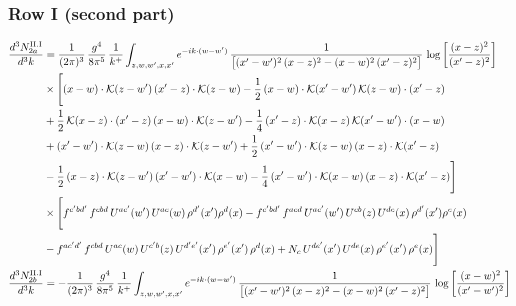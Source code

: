 \documentclass[9pt]{article}
\numberwithin{equation}{section}
\begin{document}
\subsubsection*{Row I (second part)}
\begin{align}
\frac{d^{3}N^{\rm II.I}_{2a}}{d^{3}k}&=\frac{1}{(2\pi)^{3}}\,\frac{g^{4}}{8\pi^{5}}\,\frac{1}{k^{+}}\int_{z,w,w^{\prime},x,x^{\prime}}e^{-ik\cdot(w-w^{\prime})}\,\frac{1}{\big[(x^{\prime}-w^{\prime})^{2}\,(x-z)^{2}-(x-w)^{2}\,(x^{\prime}-z)^{2}\big]}\,\log\left[\frac{(x-z)^{2}}{(x^{\prime}-z)^{2}}\right]\notag\\
&\times\Bigg[(x-w)\cdot\mathcal{K}(z-w^{\prime})\,(x^{\prime}-z)\cdot\mathcal{K}(z-w)-\frac{1}{2}\,(x-w)\cdot\mathcal{K}(x^{\prime}-w^{\prime})\,\mathcal{K}(z-w)\cdot(x^{\prime}-z)\notag \\ & +\frac{1}{2}\,\mathcal{K}(x-z)\cdot(x^{\prime}-z)\,(x-w)\cdot\mathcal{K}(z-w^{\prime}) -\frac{1}{4}\,(x^{\prime}-z)\cdot\mathcal{K}(x-z)\,\mathcal{K}(x^{\prime}-w^{\prime})\cdot(x-w)\notag \\ & +(x^{\prime}-w^{\prime})\cdot\mathcal{K}(z-w)\,(x-z)\cdot\mathcal{K}(z-w^{\prime})+\frac{1}{2}\,(x^{\prime}-w^{\prime})\cdot\mathcal{K}(z-w)\,(x-z)\cdot\mathcal{K}(x^{\prime}-z)\notag \\ & -\frac{1}{2}\,(x-z)\cdot\mathcal{K}(z-w^{\prime})\,(x^{\prime}-w^{\prime})\cdot\mathcal{K}(x-w)-\frac{1}{4}\,(x^{\prime}-w^{\prime})\cdot\mathcal{K}(x-w)\,(x-z)\cdot\mathcal{K}(x^{\prime}-z)\Bigg]\notag \\ & \times\Bigg[f^{c^{\prime}bd^{\prime}}\,f^{cbd}\, U^{ac^{\prime}}(w^{\prime})\,U^{ac}(w)\,\rho^{d^{\prime}}(x^{\prime})\rho^{d}(x)- f^{c^{\prime}bd^{\prime}}\,f^{acd}\,U^{ac^{\prime}}(w^{\prime})\,U^{cb}(z)\,U^{de}(x)\,\rho^{d^{\prime}}(x^{\prime})\rho^{e}(x) \notag \\ & -f^{ac^{\prime}d^{\prime}}\,f^{cbd}\,U^{ac}(w)\,U^{c^{\prime}b}(z)\,U^{d^{\prime}e^{\prime}}(x^{\prime})\,\rho^{e^{\prime}}(x^{\prime})\,\rho^{d}(x) +N_{c}\,U^{de^{\prime}}(x^{\prime})\,U^{de}(x)\,\rho^{e^{\prime}}(x^{\prime})\,\rho^{e}(x)\Bigg]\label{eq:B-II2a}\\
\frac{d^{3}N^{\rm II.I}_{2b}}{d^{3}k}&= -\frac{1}{(2\pi)^{3}}\,\frac{g^{4}}{8\pi^{5}}\,\frac{1}{k^{+}}\int_{z,w,w^{\prime},x,x^{\prime}}e^{-ik\cdot(w-w^{\prime})}\,\frac{1}{\big[(x^{\prime}-w^{\prime})^{2}\,(x-z)^{2}-(x-w)^{2}\,(x^{\prime}-z)^{2}\big]}\,\log\left[\frac{(x-w)^{2}}{(x^{\prime}-w^{\prime})^{2}}\right]\notag\\

\end{align}
\end{document}
